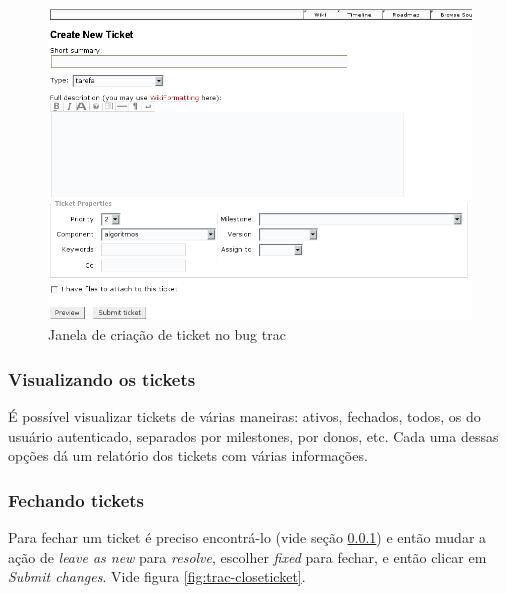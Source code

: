 \documentclass[12pt,brazil]{book}
\newcommand{\eng}[1]{\textit{#1}}
\begin{document}
\begin{figure}
  \centering
  \includegraphics[scale=.7]{trac-newticket}
  \caption{Janela de criação de ticket no bug trac}
  \label{fig:trac-newticket}
\end{figure}

\subsubsection{Visualizando os tickets}
\label{sec:visu-os-tick}

É possível visualizar tickets de várias maneiras: ativos, fechados,
todos, os do usuário autenticado, separados por milestones, por donos,
etc. Cada uma dessas opções dá um relatório dos tickets com várias
informações.

\subsubsection{Fechando tickets}
\label{sec:fechando-tickets}

Para fechar um ticket é preciso encontrá-lo (vide seção
\ref{sec:visu-os-tick}) e então mudar a ação de \eng{leave as new}
para \eng{resolve}, escolher \eng{fixed} para fechar, e então clicar
em \eng{Submit changes}. Vide figura \ref{fig:trac-closeticket}.
\end{document}
